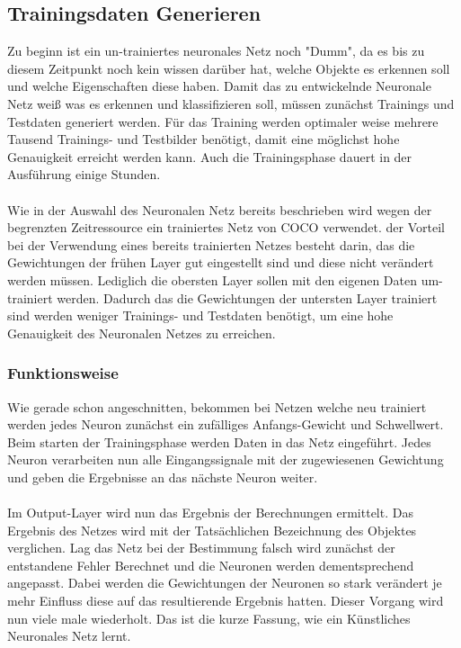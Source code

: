 \documentclass[a4paper,12pt,oneside]{article}
\begin{document}
  \subsection{Trainingsdaten Generieren} 
Zu beginn ist ein un-trainiertes neuronales Netz noch "Dumm", da es bis zu diesem Zeitpunkt noch kein wissen darüber hat, welche Objekte es erkennen soll und welche Eigenschaften diese haben. Damit das zu entwickelnde Neuronale Netz weiß was es erkennen und klassifizieren soll, müssen zunächst Trainings und Testdaten generiert werden. Für das Training werden optimaler weise mehrere Tausend Trainings- und Testbilder benötigt, damit eine möglichst hohe Genauigkeit erreicht werden kann. Auch die Trainingsphase dauert in der Ausführung einige Stunden. 
\\
\\
Wie in der Auswahl des Neuronalen Netz bereits beschrieben wird wegen der begrenzten Zeitressource ein trainiertes Netz von COCO verwendet. der Vorteil bei der Verwendung eines bereits trainierten Netzes besteht darin, das die Gewichtungen der frühen Layer gut eingestellt sind und diese nicht verändert werden müssen. Lediglich die obersten Layer sollen mit den eigenen Daten um-trainiert werden. Dadurch das die Gewichtungen der untersten Layer trainiert sind werden weniger Trainings- und Testdaten benötigt, um eine hohe Genauigkeit des Neuronalen Netzes zu erreichen.

  \subsubsection{Funktionsweise}
Wie gerade schon angeschnitten, bekommen bei Netzen welche neu trainiert werden jedes Neuron zunächst ein zufälliges Anfangs-Gewicht und Schwellwert. Beim starten der Trainingsphase werden Daten in das Netz eingeführt. Jedes Neuron verarbeiten nun alle Eingangssignale mit der zugewiesenen Gewichtung und geben die Ergebnisse an das nächste Neuron weiter. 
\\
\\
Im Output-Layer wird nun das Ergebnis der Berechnungen ermittelt. Das Ergebnis des Netzes wird mit der Tatsächlichen Bezeichnung des Objektes verglichen. Lag das Netz bei der Bestimmung falsch wird zunächst der entstandene Fehler Berechnet und die Neuronen werden dementsprechend angepasst. Dabei werden die Gewichtungen der Neuronen so stark verändert je mehr Einfluss diese auf das resultierende Ergebnis hatten. Dieser Vorgang wird nun viele male wiederholt. Das ist die kurze Fassung, wie ein Künstliches Neuronales Netz lernt. 
  
\end{document}

